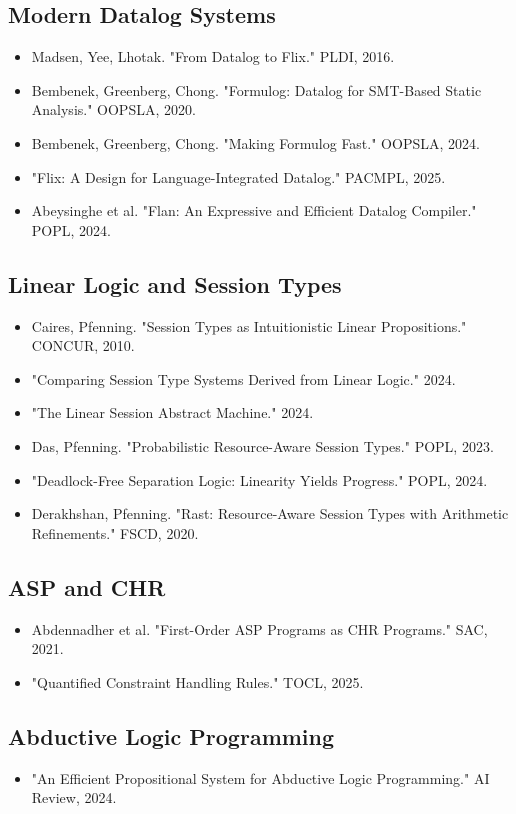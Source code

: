 \documentclass[11pt]{article}
\begin{document}
\subsection{Modern Datalog Systems}
\label{sec:orgcf0b7b3}
\begin{itemize}
\item Madsen, Yee, Lhotak. "From Datalog to Flix." PLDI, 2016.
\item Bembenek, Greenberg, Chong. "Formulog: Datalog for SMT-Based Static Analysis." OOPSLA, 2020.
\item Bembenek, Greenberg, Chong. "Making Formulog Fast." OOPSLA, 2024.
\item "Flix: A Design for Language-Integrated Datalog." PACMPL, 2025.
\item Abeysinghe et al. "Flan: An Expressive and Efficient Datalog Compiler." POPL, 2024.
\end{itemize}
\subsection{Linear Logic and Session Types}
\label{sec:orgdf65c8a}
\begin{itemize}
\item Caires, Pfenning. "Session Types as Intuitionistic Linear Propositions." CONCUR, 2010.
\item "Comparing Session Type Systems Derived from Linear Logic." 2024.
\item "The Linear Session Abstract Machine." 2024.
\item Das, Pfenning. "Probabilistic Resource-Aware Session Types." POPL, 2023.
\item "Deadlock-Free Separation Logic: Linearity Yields Progress." POPL, 2024.
\item Derakhshan, Pfenning. "Rast: Resource-Aware Session Types with Arithmetic Refinements." FSCD, 2020.
\end{itemize}
\subsection{ASP and CHR}
\label{sec:org706bbdc}
\begin{itemize}
\item Abdennadher et al. "First-Order ASP Programs as CHR Programs." SAC, 2021.
\item "Quantified Constraint Handling Rules." TOCL, 2025.
\end{itemize}
\subsection{Abductive Logic Programming}
\label{sec:org46f76ee}
\begin{itemize}
\item "An Efficient Propositional System for Abductive Logic Programming." AI Review, 2024.
\end{itemize}
\end{document}
